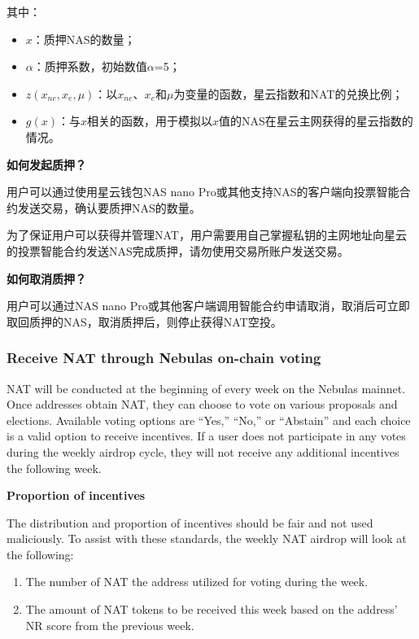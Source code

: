其中：

\begin{itemize}
	\item $x$：质押NAS的数量；
	\item $\alpha$：质押系数，初始数值$\alpha$=5；
	\item $z(x_{ne},x_{e},\mu)$：以$x_{ne}$、$x_{e}$和$\mu$为变量的函数，星云指数和NAT的兑换比例；
	\item $g(x)$：与$x$相关的函数，用于模拟以$x$值的NAS在星云主网获得的星云指数的情况。
\end{itemize}

\vspace{2em}

\textbf{如何发起质押？} 
	
用户可以通过使用星云钱包NAS nano Pro或其他支持NAS的客户端向投票智能合约发送交易，确认要质押NAS的数量。

为了保证用户可以获得并管理NAT，用户需要用自己掌握私钥的主网地址向星云的投票智能合约发送NAS完成质押，请勿使用交易所账户发送交易。

\vspace{2em}

\textbf{如何取消质押？}

用户可以通过NAS nano Pro或其他客户端调用智能合约申请取消，取消后可立即取回质押的NAS，取消质押后，则停止获得NAT空投。

\subsubsection{Receive NAT through Nebulas on-chain voting}

NAT will be conducted at the beginning of every week on the Nebulas mainnet. Once addresses obtain NAT, they can choose to vote on various proposals and elections. Available voting options are “Yes,” “No,” or “Abstain” and each choice is a valid option to receive incentives. If a user does not participate in any votes during the weekly airdrop cycle, they will not receive any additional incentives the following week.

\vspace{2em}

\textbf{Proportion of incentives}

The distribution and proportion of incentives should be fair and not used maliciously. To assist with these standards, the weekly NAT airdrop will look at the following:

\begin{enumerate}
	\item The number of NAT the address utilized for voting during the week.
	\item The amount of NAT tokens to be received this week based on the address’ NR score from the previous week.
\end{enumerate}

